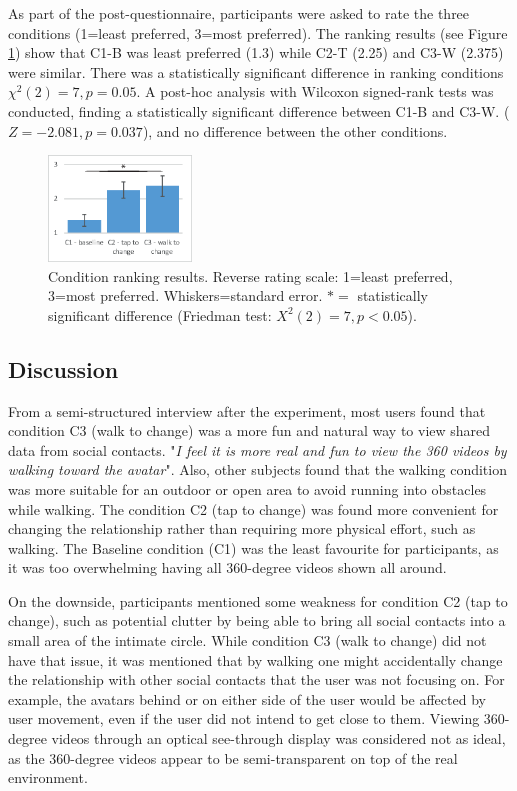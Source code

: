 As part of the post-questionnaire, participants were asked to rate the three conditions (1=least preferred, 3=most preferred). The ranking results (see Figure \ref{fig:data:ranking}) show that C1-B was least preferred (1.3) while C2-T (2.25) and C3-W (2.375) were similar. There was a statistically significant difference in ranking conditions $\chi^2(2)=7, p=0.05$. A post-hoc analysis with Wilcoxon signed-rank tests was conducted, finding a statistically significant difference between C1-B and C3-W. ($Z=-2.081, p=0.037$), and no difference between the other conditions.

\begin{figure}[h]
  \centering
  \includegraphics[width=1.5in]{images/chi/images-05.eps}
  \caption{Condition ranking results. Reverse rating scale: 1=least preferred, 3=most preferred. Whiskers=standard error. $*=$ statistically significant difference (Friedman test: $X^2(2)=7, p<0.05$).}  
      \label{fig:data:ranking}
\end{figure}

\subsection{Discussion}

From a semi-structured interview after the experiment, most users found that condition C3 (walk to change) was a more fun and natural way to view shared data from social contacts. "\textit{I feel it is more real and fun to view the 360 videos by walking toward the avatar}". Also, other subjects found that the walking condition was more suitable for an outdoor or open area to avoid running into obstacles while walking. The condition C2 (tap to change) was found more convenient for changing the relationship rather than requiring more physical effort, such as walking. The Baseline condition (C1) was the least favourite for participants, as it was too overwhelming having all 360-degree videos shown all around. 

On the downside, participants mentioned some weakness for condition C2 (tap to change), such as potential clutter by being able to bring all social contacts into a small area of the intimate circle. While condition C3 (walk to change) did not have that issue, it was mentioned that by walking one might accidentally change the relationship with other social contacts that the user was not focusing on. For example, the avatars behind or on either side of the user would be affected by user movement, even if the user did not intend to get close to them. Viewing 360-degree videos through an optical see-through display was considered not as ideal, as the 360-degree videos appear to be semi-transparent on top of the real environment.

